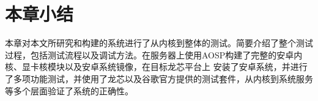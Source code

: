 



\section{本章小结}
本章对本文所研究和构建的系统进行了从内核到整体的测试。简要介绍了整个测试过程，包括测试流程以及调试方法。在服务器上使用AOSP构建了完整的安卓内核、显卡核模块以及安卓系统镜像，在目标龙芯平台上
安装了安卓系统，并进行了多项功能测试，并使用了龙芯以及谷歌官方提供的测试套件，从内核到系统服务等多个层面验证了系统的正确性。